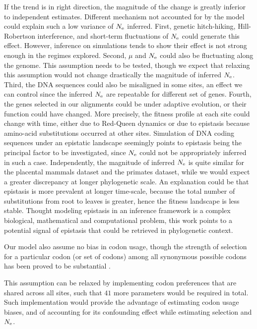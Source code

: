 If the trend is in right direction, the magnitude of the change is greatly inferior to independent estimates.
Different mechanism not accounted for by the model could explain such a low variance of $N_{\mathrm{e}}$ inferred.
First, genetic hitch-hiking, Hill-Robertson interference, and short-term fluctuations of $N_{\mathrm{e}}$ could generate this effect.
However, inference on simulations tends to show their effect is not strong enough in the regimes explored.
Second, $\mu$ and $N_{\mathrm{e}}$ could also be fluctuating along the genome.
This assumption needs to be tested, though we expect that relaxing this assumption would not change drastically the magnitude of inferred $N_{\mathrm{e}}$.
Third, the \acrshort{DNA} sequences could also be misaligned in some sites, an effect we can control since the inferred $N_{\mathrm{e}}$ are repeatable for different set of genes.
Fourth, the genes selected in our alignments could be under adaptive evolution, or their function could have changed.
More precisely, the fitness profile at each site could change with time, either due to Red-Queen dynamics or due to epistasis because amino-acid \glspl{substitution} occurred at other sites.
Simulation of \acrshort{DNA} coding sequences under an epistatic landscape seemingly points to epistasis being the principal factor to be investigated, since $N_{\mathrm{e}}$ could not be appropriately inferred in such a case.
Independently, the magnitude of inferred $N_{\mathrm{e}}$ is quite similar for the placental mammals dataset and the primates dataset, while we would expect a greater discrepancy at longer phylogenetic scale.
An explanation could be that epistasis is more prevalent at longer time-scale, because the total number of \glspl{substitution} from root to leaves is greater, hence the fitness landscape is less stable.
Thought modeling epistasis in an inference framework is a complex biological, mathematical and computational problem, this work points to a potential signal of epistasis that could be retrieved in phylogenetic context.

Our model also assume no bias in \gls{codon} usage, though the strength of selection for a particular \gls{codon} (or set of codons) among all synonymous possible \glspl{codon} has been proved to be substantial \citep{Plotkin2011}.

This assumption can be relaxed by implementing \gls{codon} preferences that are shared across all sites, such that $41$ more parameters would be required in total.
Such implementation would provide the advantage of estimating \gls{codon} usage biases, and of accounting for its confounding effect while estimating selection and $N_{\mathrm{e}}$.

